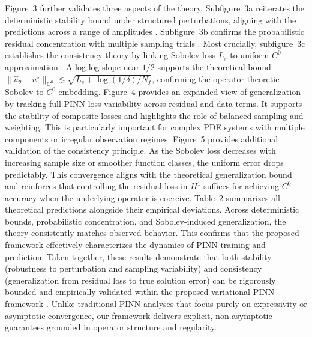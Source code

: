 \documentclass[11pt, a4paper]{article}
\begin{document}
Figure~3 further validates three aspects of the theory. Subfigure~3a reiterates the deterministic stability bound under structured perturbations, aligning with the predictions across a range of amplitudes \cite{gazoulis2023operator, de2022error}. Subfigure~3b confirms the probabilistic residual concentration with multiple sampling trials \cite{de2024comprehensive}. Most crucially, subfigure~3c establishes the consistency theory by linking Sobolev loss \( L_s \) to uniform \( C^0 \) approximation \cite{fabiani2023stability}. A log-log slope near \( 1/2 \) supports the theoretical bound \( \| \hat{u}_\theta - u^\star \|_{C^0} \lesssim \sqrt{L_s + \log(1/\delta)/N_f} \), confirming the operator-theoretic Sobolev-to-\( C^0 \) embedding. Figure~4 provides an expanded view of generalization by tracking full PINN loss variability across residual and data terms. It supports the stability of composite losses and highlights the role of balanced sampling and weighting. This is particularly important for complex PDE systems with multiple components or irregular observation regimes. Figure~5 provides additional validation of the consistency principle. As the Sobolev loss decreases with increasing sample size or smoother function classes, the uniform error drops predictably. This convergence aligns with the theoretical generalization bound and reinforces that controlling the residual loss in \( H^1 \) suffices for achieving \( C^0 \) accuracy when the underlying operator is coercive. Table~2 summarizes all theoretical predictions alongside their empirical deviations. Across deterministic bounds, probabilistic concentration, and Sobolev-induced generalization, the theory consistently matches observed behavior. This confirms that the proposed framework effectively characterizes the dynamics of PINN training and prediction. Taken together, these results demonstrate that both stability (robustness to perturbation and sampling variability) and consistency (generalization from residual loss to true solution error) can be rigorously bounded and empirically validated within the proposed variational PINN framework \cite{gazoulis2023operator, molinaro2023theory, kutyniok2023theoretical}. Unlike traditional PINN analyses that focus purely on expressivity or asymptotic convergence, our framework delivers explicit, non-asymptotic guarantees grounded in operator structure and regularity.

\vspace{1em}
\end{document}
